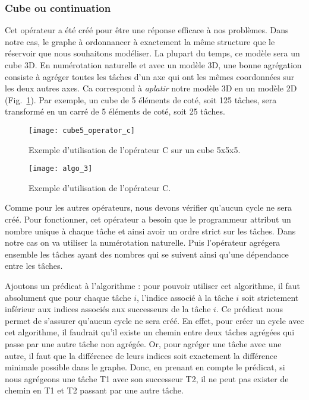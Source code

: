 \subsubsection{Cube ou continuation}
Cet opérateur a été créé pour être une réponse efficace à nos problèmes.
%
Dans notre cas, le graphe à ordonnancer à exactement la même structure que le réservoir que nous souhaitons modéliser.
%
La plupart du temps, ce modèle sera un cube 3D.
%
En numérotation naturelle et avec un modèle 3D, une bonne agrégation consiste à agréger toutes les tâches d'un axe qui ont les mêmes coordonnées sur les deux autres axes.
%
Ca correspond à {\em aplatir} notre modèle 3D en un modèle 2D (Fig.~\ref{fig:cube5_algo_C}).
%
Par exemple, un cube de 5 éléments de coté, soit 125 tâches, sera transformé en un carré de 5 éléments de coté, soit 25 tâches.


\begin{figure}[t!]
  \centering
  \texttt{[image: cube5\_operator\_c]}
  \caption{Exemple d'utilisation de l'opérateur C sur un cube 5x5x5.}
  \label{fig:cube5_algo_C}
\end{figure}


\begin{figure}[t!]
  \centering
  \texttt{[image: algo\_3]}
  \caption{Exemple d'utilisation de l'opérateur C.}
  \label{fig:algo_C}
\end{figure}


Comme pour les autres opérateurs, nous devons vérifier qu'aucun cycle ne sera créé.
%
Pour fonctionner, cet opérateur a besoin que le programmeur attribut un nombre unique à chaque tâche et ainsi avoir un ordre strict sur les tâches.
%
Dans notre cas on va utiliser la numérotation naturelle.
%
Puis l'opérateur agrégera ensemble les tâches ayant des nombres qui se suivent ainsi qu'une dépendance entre les tâches.

Ajoutons un prédicat à l'algorithme : pour pouvoir utiliser cet algorithme, il faut absolument que pour chaque tâche $i$, l'indice associé à la tâche $i$ soit strictement inférieur aux indices associés aux successeurs de la tâche $i$.
%
Ce prédicat nous permet de s'assurer qu'aucun cycle ne sera créé.
%
En effet, pour créer un cycle avec cet algorithme, il faudrait qu'il existe un chemin entre deux tâches agrégées qui passe par une autre tâche non agrégée.
%
Or, pour agréger une tâche avec une autre, il faut que la différence de leurs indices soit exactement la différence minimale possible dans le graphe.
%
Donc, en prenant en compte le prédicat, si nous agrégeons une tâche T1 avec son successeur T2, il ne peut pas exister de chemin en T1 et T2 passant par une autre tâche.


